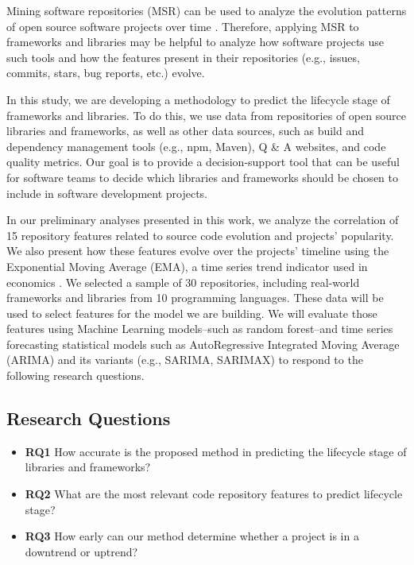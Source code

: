 \documentclass[10pt,conference,peerreview]{IEEEtran}
\begin{document}
Mining software repositories (MSR) can be used to analyze the evolution patterns of open source software projects over time \cite{gold2022,hassan2008}. Therefore, applying MSR to frameworks and libraries may be helpful to analyze how software projects use such tools and how the features present in their repositories (e.g., issues, commits, stars, bug reports, etc.) evolve.

In this study, we are developing a methodology to predict the lifecycle stage of frameworks and libraries. To do this, we use data from repositories of open source libraries and frameworks, as well as other data sources, such as build and dependency management tools (e.g., npm, Maven), Q \& A websites, and code quality metrics. Our goal is to provide a decision-support tool that can be useful for software teams to decide which libraries and frameworks should be chosen to include in software development projects.

In our preliminary analyses presented in this work, we analyze the correlation of 15 repository features related to source code evolution and projects' popularity. We also present how these features evolve over the projects' timeline using the Exponential Moving Average (EMA), a time series trend indicator used in economics \cite{hunter1986}. We selected a sample of 30 repositories, including real-world frameworks and libraries from 10 programming languages. These data will be used to select features for the model we are building. We will evaluate those features using Machine Learning models--such as random forest--and time series forecasting statistical models such as AutoRegressive Integrated Moving Average (ARIMA) and its variants (e.g., SARIMA, SARIMAX) to respond to the following research questions.

\subsection{Research Questions}

\begin{itemize}
    \item \textbf{RQ1} How accurate is the proposed method in predicting the lifecycle stage of libraries and frameworks?
    \item \textbf{RQ2} What are the most relevant code repository features to predict lifecycle stage?
    \item \textbf{RQ3} How early can our method determine whether a project is in a downtrend or uptrend?
\end{itemize}
\end{document}
